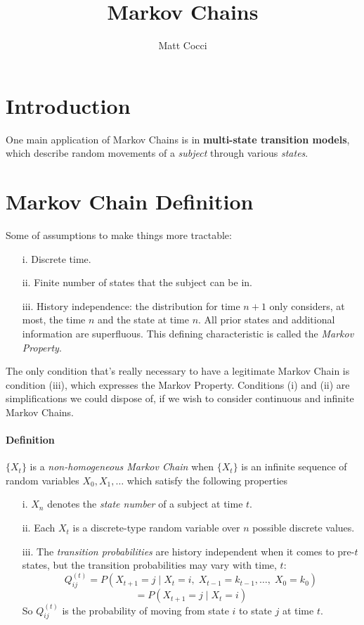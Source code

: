 \documentclass[a4paper,12pt]{scrartcl}
\author{Matt Cocci}
\title{Markov Chains}
\begin{document}
\maketitle

\section{Introduction}

One main application of Markov Chains is in \textbf{multi-state 
transition models}, which describe random movements of a \emph{subject}
through various \emph{states}.  

\section{Markov Chain Definition}

Some of assumptions to make things more tractable:
\begin{enumerate}
   \item[i.]{Discrete time.}
   \item[ii.]{Finite number of states that the subject can be in.}
   \item[iii.]{History independence: the distribution for time $n+1$
      only considers, at most, the time $n$ and the state at time $n$.
      All prior states and additional information are superfluous. 
      This defining characteristic is called the {\sl Markov
      Property}.}
\end{enumerate}
The only condition that's really necessary to have a legitimate 
Markov Chain is condition (iii), which expresses the Markov Property.
Conditions (i) and (ii) are simplifications we could dispose of, if
we wish to consider continuous and infinite Markov Chains.

\paragraph{Definition} $\{X_t\}$ is a {\sl non-homogeneous Markov Chain}
when $\{X_t\}$ is an infinite sequence of random variables $X_0, X_1,\ldots$
which satisfy the following properties
\begin{enumerate}
   \item[i.]{$X_n$ denotes the \emph{state number} of a subject at time
      $t$.}
   \item[ii.]{Each $X_t$ is a discrete-type random variable over $n$
      possible discrete values.}
   \item[iii.]{The {\sl transition probabilities} are history
      independent when it comes to pre-$t$ states, 
      but the transition probabilities may vary with time, $t$:
      \[ Q_{ij}^{(t)} = P( X_{t+1}=j \; | \; X_t = i, \; X_{t-1}=k_{t-1},
	 \ldots,\; X_0 = k_0 ) \]
      \[ =P(X_{t+1} = j \; | \; X_t = i ) \]
      So $Q_{ij}^{(t)}$ is the probability of moving from
      state $i$ to state $j$ at time $t$.
      }
\end{enumerate}
\end{document}
